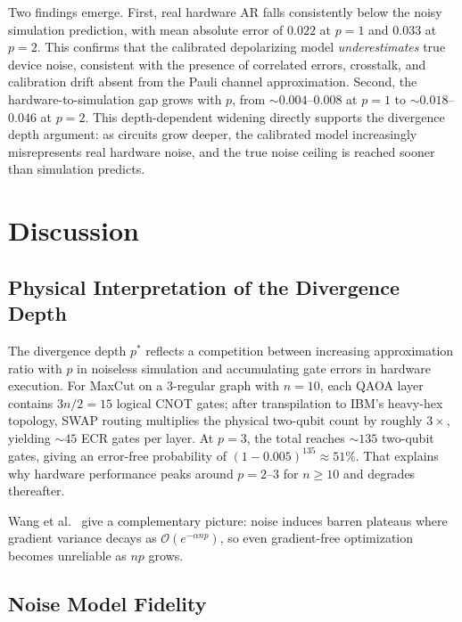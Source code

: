 \documentclass[12pt]{article}
\begin{document}
Two findings emerge. First, real hardware AR falls consistently below the noisy simulation
prediction, with mean absolute error of $0.022$ at $p = 1$ and $0.033$ at $p = 2$.
This confirms that the calibrated depolarizing model \emph{underestimates} true device noise,
consistent with the presence of correlated errors, crosstalk, and calibration drift absent from
the Pauli channel approximation. Second, the hardware-to-simulation gap grows with $p$, from
$\sim 0.004$--$0.008$ at $p = 1$ to $\sim 0.018$--$0.046$ at $p = 2$.
This depth-dependent widening directly supports the divergence depth argument: as circuits
grow deeper, the calibrated model increasingly misrepresents real hardware noise,
and the true noise ceiling is reached sooner than simulation predicts.

\section{Discussion}

\subsection{Physical Interpretation of the Divergence Depth}

The divergence depth $p^*$ reflects a competition between increasing approximation ratio with $p$ in noiseless simulation and accumulating gate errors in hardware execution. For MaxCut on a 3-regular graph with $n = 10$, each QAOA layer contains $3n/2 = 15$ logical CNOT gates; after transpilation to IBM's heavy-hex topology, SWAP routing multiplies the physical two-qubit count by roughly $3\times$, yielding $\sim 45$ ECR gates per layer. At $p = 3$, the total reaches $\sim 135$ two-qubit gates, giving an error-free probability of $(1 - 0.005)^{135} \approx 51\%$. That explains why hardware performance peaks around $p = 2$--$3$ for $n \geq 10$ and degrades thereafter.

Wang et al.\ \cite{wang2021noisebarren} give a complementary picture: noise induces barren plateaus where gradient variance decays as $\mathcal{O}(e^{-\alpha n p})$, so even gradient-free optimization becomes unreliable as $np$ grows.

\subsection{Noise Model Fidelity}
\end{document}
